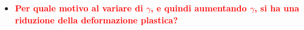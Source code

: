 \documentclass[a4paper, 15pt]{article}
\begin{document}
\begin{itemize}
	
\item \textcolor{red}{\textbf{Per quale motivo al variare di $\gamma$, e quindi aumentando $\gamma$, si ha una riduzione della deformazione plastica?}}\\


\end{itemize}
\end{document}
